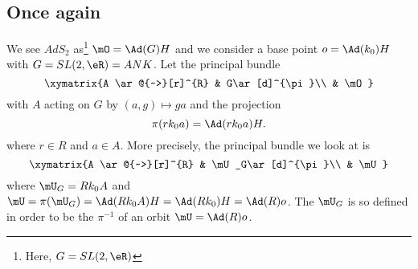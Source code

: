 \subsection{Once again}  \label{pg_DiracADsdeux}

We see $AdS_2$ as\footnote{Here, $G=SL(2,\eR)$} $\mO=\Ad(G)H$ and we consider a base point $o=\Ad(k_0)H$ with $G=SL(2,\eR)=ANK$. Let the principal bundle
\[ 
\xymatrix{%
   A \ar@{~>}[r]^{R}        &   G\ar[d]^{\pi}\\
    &   \mO
}
\]
with $A$ acting on $G$ by $(a,g)\mapsto ga$ and the projection
\begin{equation}
\pi(rk_0a)=\Ad(rk_0a)H.
\end{equation}
where $r\in R$ and $a\in A$. More precisely, the principal bundle we look at is
\begin{equation}
\xymatrix{%
   A \ar@{~>}[r]^{R}        &   \mU_G\ar[d]^{\pi}\\
    &   \mU
}
\end{equation}
where $\mU_G=Rk_0A$ and $\mU=\pi(\mU_G)=\Ad(Rk_0A)H=\Ad(Rk_0)H=\Ad(R)o$. The $\mU_G$ is so defined in order to be the $\pi^{-1}$ of an orbit $\mU=\Ad(R)o$.

